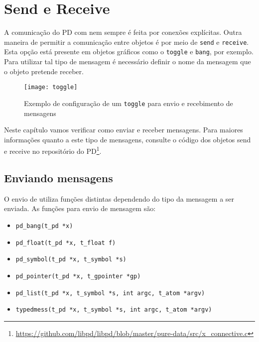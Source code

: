 \chapter{Send e Receive}


A comunicação do PD com \externals nem sempre é feita por conexões explícitas.
Outra maneira de permitir a comunicação entre objetos é por meio de \texttt{send} e
\texttt{receive}.
Esta opção está presente em objetos gráficos como o \texttt{toggle} e \texttt{bang}, por exemplo.
Para utilizar tal tipo de mensagem é necessário definir o nome da mensagem que
o objeto pretende receber.

\begin{figure}[h!]
\centering
\texttt{[image: toggle]}
\caption{Exemplo de configuração de um \texttt{toggle} para envio e recebimento de mensagens}
\end{figure}

Neste capítulo vamos verificar como enviar e receber mensagens.
Para maiores informações quanto a este tipo de mensagens, consulte o código dos
objetos send e receive no repositório do PD\footnote{
\url{https://github.com/libpd/libpd/blob/master/pure-data/src/x_connective.c}
}.

\section{Enviando mensagens}

O envio de utiliza funções distintas dependendo do tipo da mensagem a ser enviada.
As funções para envio de mensagem são:

\begin{itemize}
\item \texttt{pd\_bang(t\_pd *x)}
\item \texttt{pd\_float(t\_pd *x, t\_float f)}
\item \texttt{pd\_symbol(t\_pd *x, t\_symbol *s)}
\item \texttt{pd\_pointer(t\_pd *x, t\_gpointer *gp)}
\item \texttt{pd\_list(t\_pd *x, t\_symbol *s, int argc, t\_atom *argv)}
\item \texttt{typedmess(t\_pd *x, t\_symbol *s, int argc, t\_atom *argv)}
\end{itemize}

